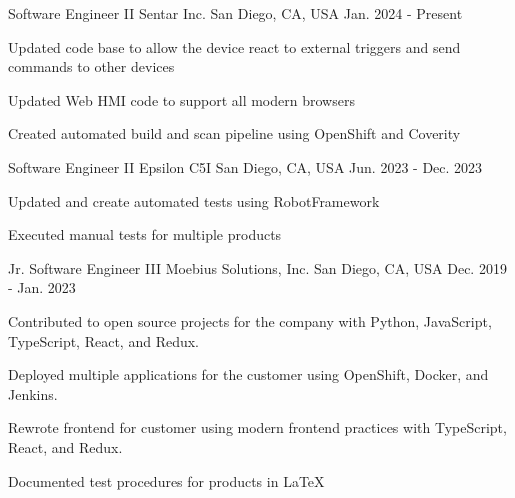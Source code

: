 

\begin{cventries}

	\cventry
	{Software Engineer II} %
	{Sentar Inc.} %
	{San Diego, CA, USA} %
	{Jan. 2024 - Present} %
	{
		\begin{cvitems}
			\item {Updated code base to allow the device react to external triggers and send commands to other devices}
			\item {Updated Web HMI code to support all modern browsers}
			\item {Created automated build and scan pipeline using OpenShift and Coverity}
		\end{cvitems}
	}

	\cventry
	{Software Engineer II} %
	{Epsilon C5I} %
	{San Diego, CA, USA} %
	{Jun. 2023 - Dec. 2023} %
	{
		\begin{cvitems}
			\item {Updated and create automated tests using RobotFramework}
			\item {Executed manual tests for multiple products}
		\end{cvitems}
	}

	\cventry
	{Jr. Software Engineer III} %
	{Moebius Solutions, Inc.} %
	{San Diego, CA, USA} %
	{Dec. 2019 - Jan. 2023} %
	{
		\begin{cvitems} %
			\item {Contributed to open source projects for the company with Python, JavaScript, TypeScript, React, and Redux.}
			\item {Deployed multiple applications for the customer using OpenShift, Docker, and Jenkins.}
			\item {Rewrote frontend for customer using modern frontend practices with TypeScript, React, and Redux.}
			\item {Documented test procedures for products in LaTeX}
		\end{cvitems}
	}


\end{cventries}
